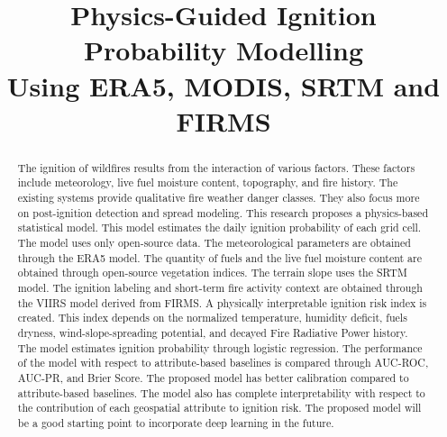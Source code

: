 \documentclass[conference]{IEEEtran}
\begin{document}
\title{Physics-Guided Ignition Probability Modelling\\
Using ERA5, MODIS, SRTM and FIRMS}

\author{
\and
{}
}

\maketitle

\begin{abstract}
The ignition of wildfires results from the interaction of various factors. These factors include meteorology, live fuel moisture content, topography, and fire history. The existing systems provide qualitative fire weather danger classes. They also focus more on post-ignition detection and spread modeling. This research proposes a physics-based statistical model. This model estimates the daily ignition probability of each grid cell. The model uses only open-source data. The meteorological parameters are obtained through the ERA5 model. The quantity of fuels and the live fuel moisture content are obtained through open-source vegetation indices. The terrain slope uses the SRTM model. The ignition labeling and short-term fire activity context are obtained through the VIIRS model derived from FIRMS. A physically interpretable ignition risk index is created. This index depends on the normalized temperature, humidity deficit, fuels dryness, wind-slope-spreading potential, and decayed Fire Radiative Power history. The model estimates ignition probability through logistic regression. The performance of the model with respect to attribute-based baselines is compared through AUC-ROC, AUC-PR, and Brier Score. The proposed model has better calibration compared to attribute-based baselines. The model also has complete interpretability with respect to the contribution of each geospatial attribute to ignition risk. The proposed model will be a good starting point to incorporate deep learning in the future.
\end{abstract}
\end{document}
